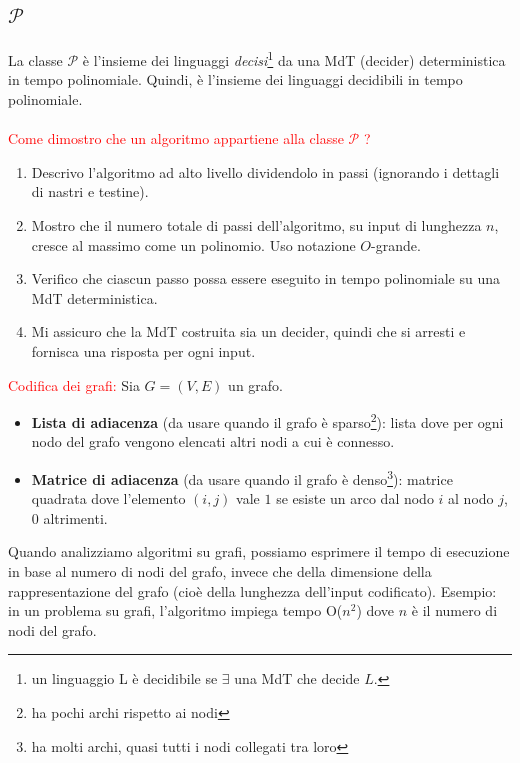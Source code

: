 \documentclass{article}  %
\theoremstyle{definition}
\begin{document}
\subsection{$\mathcal{P}$}
La classe $\mathcal{P}$ è l'insieme dei linguaggi \textit{decisi}\footnote{un linguaggio L è decidibile se $\exists$ una MdT che decide $L$.} da una MdT (decider) deterministica in tempo polinomiale.
Quindi, è l'insieme dei linguaggi decidibili in tempo polinomiale. \\ \\
\textcolor{red}{Come dimostro che un algoritmo appartiene alla classe $\mathcal{P}$ ?}
\begin{enumerate}
	\item Descrivo l'algoritmo ad alto livello dividendolo in passi (ignorando i dettagli di nastri e testine).
	\item Mostro che il numero totale di passi dell'algoritmo, su input di lunghezza $n$, cresce al massimo come un polinomio. Uso notazione $O$-grande.
	\item Verifico che ciascun passo possa essere eseguito in tempo polinomiale su una MdT deterministica.
	\item Mi assicuro che la MdT costruita sia un decider, quindi che si arresti e fornisca una risposta per ogni input.
\end{enumerate}
\textcolor{red}{Codifica dei grafi:} Sia $G=(V,E)$ un grafo.
\begin{itemize}
	\item \textbf{Lista di adiacenza} (da usare quando il grafo è sparso\footnote{ha pochi archi rispetto ai nodi}): lista dove per ogni nodo del grafo vengono elencati altri nodi a cui è connesso.
	\item \textbf{Matrice di adiacenza} (da usare quando il grafo è denso\footnote{ha molti archi, quasi tutti i nodi collegati tra loro}): matrice quadrata dove l'elemento $(i,j)$ vale $1$
	      se esiste un arco dal nodo $i$ al nodo $j$, $0$ altrimenti.
\end{itemize}
\begin{osservazioni}[Osservazione]
	\footnotesize
	Quando analizziamo algoritmi su grafi, possiamo esprimere il tempo di esecuzione in base al numero di nodi del grafo, invece che della dimensione della rappresentazione del
	grafo (cioè della lunghezza dell’input codificato). Esempio: in un problema su grafi, l'algoritmo impiega tempo O($n^2$) dove $n$ è il numero di nodi del grafo.
\end{osservazioni}
\end{document}
